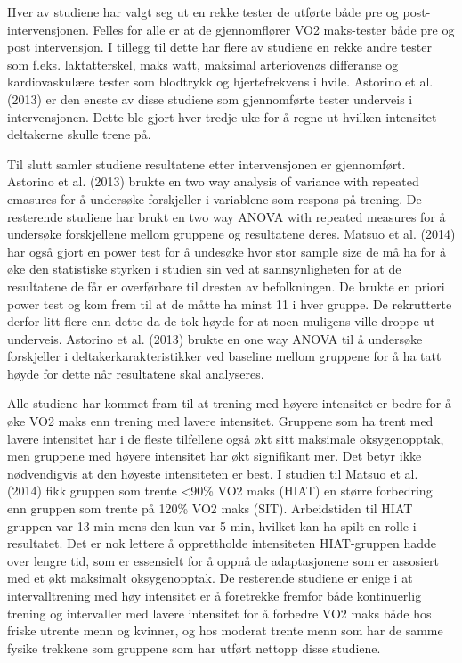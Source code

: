 \documentclass[
  letterpaper,
  DIV=11,
  numbers=noendperiod]{scrartcl}
\begin{document}
Hver av studiene har valgt seg ut en rekke tester de utførte både pre og
post-intervensjonen. Felles for alle er at de gjennomflører VO2
maks-tester både pre og post intervensjon. I tillegg til dette har flere
av studiene en rekke andre tester som f.eks. laktatterskel, maks watt,
maksimal arteriovenøs differanse og kardiovaskulære tester som blodtrykk
og hjertefrekvens i hvile. Astorino et al. (2013) er den eneste av disse
studiene som gjennomførte tester underveis i intervensjonen. Dette ble
gjort hver tredje uke for å regne ut hvilken intensitet deltakerne
skulle trene på.

Til slutt samler studiene resultatene etter intervensjonen er
gjennomført. Astorino et al. (2013) brukte en two way analysis of
variance with repeated emasures for å undersøke forskjeller i variablene
som respons på trening. De resterende studiene har brukt en two way
ANOVA with repeated measures for å undersøke forskjellene mellom
gruppene og resultatene deres. Matsuo et al. (2014) har også gjort en
power test for å undesøke hvor stor sample size de må ha for å øke den
statistiske styrken i studien sin ved at sannsynligheten for at de
resultatene de får er overførbare til dresten av befolkningen. De brukte
en priori power test og kom frem til at de måtte ha minst 11 i hver
gruppe. De rekrutterte derfor litt flere enn dette da de tok høyde for
at noen muligens ville droppe ut underveis. Astorino et al. (2013)
brukte en one way ANOVA til å undersøke forskjeller i
deltakerkarakteristikker ved baseline mellom gruppene for å ha tatt
høyde for dette når resultatene skal analyseres.

Alle studiene har kommet fram til at trening med høyere intensitet er
bedre for å øke VO2 maks enn trening med lavere intensitet. Gruppene som
ha trent med lavere intensitet har i de fleste tilfellene også økt sitt
maksimale oksygenopptak, men gruppene med høyere intensitet har økt
signifikant mer. Det betyr ikke nødvendigvis at den høyeste intensiteten
er best. I studien til Matsuo et al. (2014) fikk gruppen som trente
\textless90\% VO2 maks (HIAT) en større forbedring enn gruppen som
trente på 120\% VO2 maks (SIT). Arbeidstiden til HIAT gruppen var 13 min
mens den kun var 5 min, hvilket kan ha spilt en rolle i resultatet. Det
er nok lettere å opprettholde intensiteten HIAT-gruppen hadde over
lengre tid, som er essensielt for å oppnå de adaptasjonene som er
assosiert med et økt maksimalt oksygenopptak. De resterende studiene er
enige i at intervalltrening med høy intensitet er å foretrekke fremfor
både kontinuerlig trening og intervaller med lavere intensitet for å
forbedre VO2 maks både hos friske utrente menn og kvinner, og hos
moderat trente menn som har de samme fysike trekkene som gruppene som
har utført nettopp disse studiene.
\end{document}
